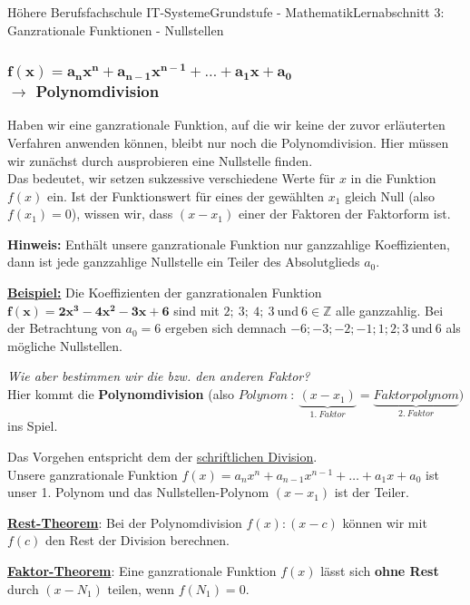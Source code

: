 \documentclass[11pt,twocolumn,oneside,openany,headings=optiontotoc,11pt,numbers=noenddot]{article}
\begin{document}
\begin{worksheet}{Höhere Berufsfachschule IT-Systeme}{Grundstufe - Mathematik}{Lernabschnitt 3: Ganzrationale Funktionen - Nullstellen}
		\subsubsection{\(\mathbf{f(x) = a_nx^n + a_{n-1}x^{n-1} + \ldots{}+a_1x + a_0}\)\\\( \rightarrow \) Polynomdivision}
		Haben wir eine ganzrationale Funktion, auf die wir keine der zuvor erläuterten Verfahren anwenden können, bleibt nur noch die Polynomdivision. Hier müssen wir zunächst durch ausprobieren eine Nullstelle finden.\\
		Das bedeutet, wir setzen sukzessive verschiedene Werte für \(x\) in die Funktion \(f(x)\) ein. Ist der Funktionswert für eines der gewählten \(x_1\) gleich Null (also \(f(x_1) = 0\)), wissen wir, dass \((x-x_1)\) einer der Faktoren der Faktorform ist.
		\begin{framed}
			\noindent
			\textbf{Hinweis:} Enthält unsere ganzrationale Funktion nur ganzzahlige Koeffizienten, dann ist jede ganzzahlige Nullstelle ein Teiler des Absolutglieds \(a_0\).
		\end{framed}
		\noindent
		\textbf{\underline{Beispiel:}} Die Koeffizienten der ganzrationalen Funktion \(\mathbf{f(x) = 2x^3-4x^2-3x+6}\) sind mit \(2;\ 3;\ 4;\ 3\ \text{und}\ 6 \in \mathbb{Z}\) alle ganzzahlig. Bei der Betrachtung von \(a_0=6\) ergeben sich demnach \(-6; -3; -2; -1; 1; 2; 3\ \text{und}\ 6\) als mögliche Nullstellen.\\
		\par\noindent
		\textit{Wie aber bestimmen wir die bzw. den anderen Faktor?}\\
		Hier kommt die \textbf{Polynomdivision} (also \(Polynom\ :\ \underbrace{(x-x_1)}_{1.\ Faktor} = \underbrace{Faktorpolynom}_{2.\ Faktor})\) ins Spiel.\\
		\par\noindent
		Das Vorgehen entspricht dem der \underline{schriftlichen Division}.\\
		Unsere ganzrationale Funktion \(f(x) = a_nx^n + a_{n-1}x^{n-1}+\ldots{}+a_1x + a_0\) ist unser 1. Polynom und das \grq{}Nullstellen-Polynom\grq{} \((x-x_1)\) ist der Teiler.
		\begin{framed}
			\noindent
			\underline{\textbf{Rest-Theorem}}: Bei der Polynomdivision \(f(x):(x-c)\) können wir mit \(f(c)\) den Rest der Division berechnen.\\
			\par\noindent
			\underline{\textbf{Faktor-Theorem}}: Eine ganzrationale Funktion \(f(x)\) lässt sich \textbf{ohne Rest} durch \((x-N_1)\) teilen, wenn \(f(N_1) = 0\).\\

\end{framed}
\end{worksheet}
\end{document}

